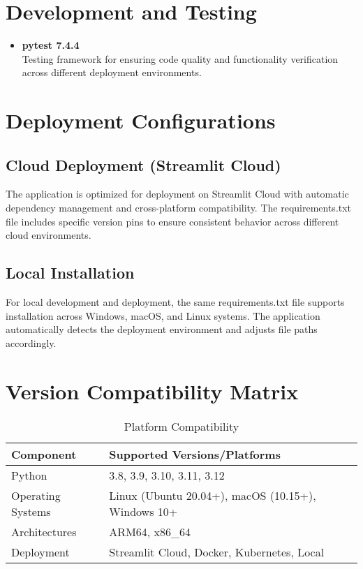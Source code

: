 \section*{Development and Testing}

\begin{itemize}
	\item \textbf{pytest 7.4.4} \\
	Testing framework for ensuring code quality and functionality verification across different deployment environments.
\end{itemize}

\section*{Deployment Configurations}

\subsection*{Cloud Deployment (Streamlit Cloud)}
The application is optimized for deployment on Streamlit Cloud with automatic dependency management and cross-platform compatibility. The requirements.txt file includes specific version pins to ensure consistent behavior across different cloud environments.

\subsection*{Local Installation}
For local development and deployment, the same requirements.txt file supports installation across Windows, macOS, and Linux systems. The application automatically detects the deployment environment and adjusts file paths accordingly.

\section*{Version Compatibility Matrix}

\begin{table}[h]
	\centering
	\caption{Platform Compatibility}
	\begin{tabular}{|p{3cm}|p{10cm}|}
		\hline
		\textbf{Component} & \textbf{Supported Versions/Platforms} \\
		\hline
		Python & 3.8, 3.9, 3.10, 3.11, 3.12 \\
		\hline
		Operating Systems & Linux (Ubuntu 20.04+), macOS (10.15+), Windows 10+ \\
		\hline
		Architectures & ARM64, x86\_64 \\
		\hline
		Deployment & Streamlit Cloud, Docker, Kubernetes, Local \\
		\hline
	\end{tabular}
	\label{tab:platform-compatibility}
\end{table}

